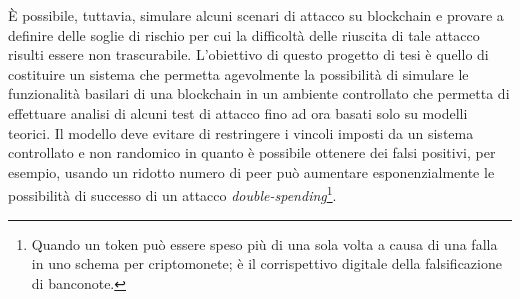 È possibile, tuttavia, simulare alcuni scenari di attacco su blockchain e provare a definire delle soglie di rischio per cui la difficoltà delle riuscita di tale attacco risulti essere non trascurabile.\newline
L'obiettivo di questo progetto di tesi è quello di costituire un sistema che permetta agevolmente la possibilità di simulare le funzionalità basilari di una blockchain in un ambiente controllato che permetta di effettuare analisi di alcuni test di attacco fino ad ora basati solo su modelli teorici. Il modello deve evitare di restringere i vincoli imposti da un sistema controllato e non randomico in quanto è possibile ottenere dei falsi positivi, per esempio, usando un ridotto numero di peer può aumentare esponenzialmente le possibilità di successo di un attacco \textit{double-spending}\footnote{Quando un token può essere speso più di una sola volta a causa di una falla in uno schema per criptomonete; è il corrispettivo digitale della falsificazione di banconote.}.

